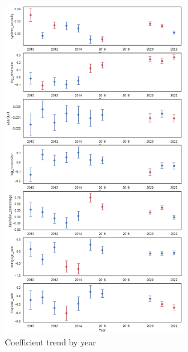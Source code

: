 \documentclass[12pt,twoside,letterpaper]{article}
\begin{document}
\begin{figure}[!ht]
    \centering
\includegraphics[width=0.7\textwidth]{figures/coefficient_trend.png}
    \caption{Coefficient trend by year}
    \label{fig:coefficient_trend}
\end{figure}




\newpage

\printbibliography
\end{document}
